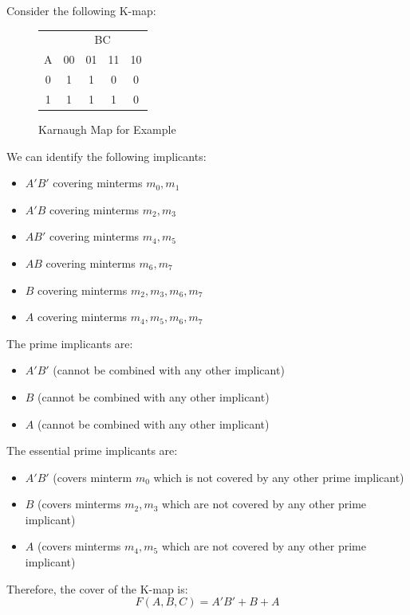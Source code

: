 \documentclass[11pt]{report}
\begin{document}
\begin{example}
    Consider the following K-map:
    \begin{figure}[h!]
        \centering
        \begin{tabular}{c|c|c|c|c}
            & \multicolumn{4}{c}{BC} \\
            \cline{2-5}
            A & 00 & 01 & 11 & 10 \\
            \hline
            0 & 1 & 1 & 0 & 0 \\
            1 & 1 & 1 & 1 & 0 \\
        \end{tabular}
        \caption{Karnaugh Map for Example}
        \label{fig:example_karnaugh_map_implicant}
    \end{figure}
    We can identify the following implicants:
    \begin{itemize}
        \item $A'B'$ covering minterms $m_0, m_1$
        \item $A'B$ covering minterms $m_2, m_3$
        \item $AB'$ covering minterms $m_4, m_5$
        \item $AB$ covering minterms $m_6, m_7$
        \item $B$ covering minterms $m_2, m_3, m_6, m_7$
        \item $A$ covering minterms $m_4, m_5, m_6, m_7$
    \end{itemize}
    The prime implicants are:
    \begin{itemize}
        \item $A'B'$ (cannot be combined with any other implicant)
        \item $B$ (cannot be combined with any other implicant)
        \item $A$ (cannot be combined with any other implicant)
    \end{itemize}
    The essential prime implicants are:
    \begin{itemize}
        \item $A'B'$ (covers minterm $m_0$ which is not covered by any other prime implicant)
        \item $B$ (covers minterms $m_2, m_3$ which are not covered by any other prime implicant)
        \item $A$ (covers minterms $m_4, m_5$ which are not covered by any other prime implicant)
    \end{itemize}
    Therefore, the cover of the K-map is:
    $$
    F(A,B,C) = A'B' + B + A
    $$
\end{example}
\end{document}
